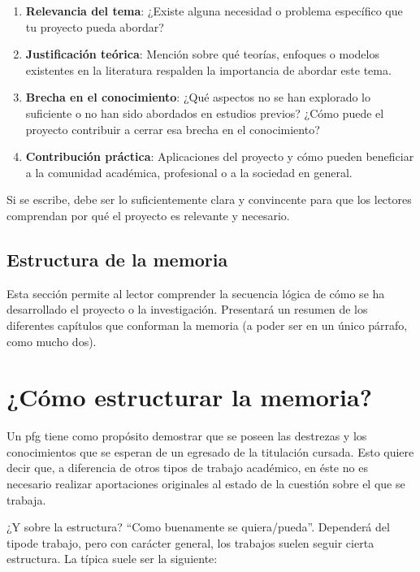\documentclass[%
    school=etsisi,%
    degree=61TI,%
]{upm-report}
\begin{document}
\begin{enumerate}
    \item \textbf{Relevancia del tema}: ¿Existe alguna necesidad o
        problema específico que tu proyecto pueda abordar?
    \item \textbf{Justificación teórica}: Mención sobre qué teorías,
        enfoques o modelos existentes en la literatura respalden la
        importancia de abordar este tema.
    \item \textbf{Brecha en el conocimiento}: ¿Qué aspectos no se han
        explorado lo suficiente o no han sido abordados en estudios
        previos? ¿Cómo puede el proyecto contribuir a cerrar esa brecha
        en el conocimiento?
    \item \textbf{Contribución práctica}: Aplicaciones del proyecto y
        cómo pueden beneficiar a la comunidad académica, profesional o
        a la sociedad en general.
\end{enumerate}

Si se escribe, debe ser lo suficientemente clara y convincente para que
los lectores comprendan por qué el proyecto es relevante y necesario.

\section{Estructura de la memoria}

Esta sección permite al lector comprender la secuencia lógica de cómo se
ha desarrollado el proyecto o la investigación. Presentará un resumen de
los diferentes capítulos que conforman la memoria (a poder ser en un
único párrafo, como mucho dos).

\chapter{¿Cómo estructurar la memoria?}
\label{s:como-estructurar}

Un \gls{pfg} tiene como propósito demostrar que se poseen las destrezas
y los conocimientos que se esperan de un egresado de la titulación
cursada. Esto quiere decir que, a diferencia de otros tipos de trabajo
académico, en éste no es necesario realizar aportaciones originales al
estado de la cuestión sobre el que se trabaja.

¿Y sobre la estructura? \enquote{Como buenamente se quiera/pueda}.
Dependerá del tipode trabajo, pero con carácter general, los trabajos
suelen seguir cierta estructura. La típica suele ser la siguiente:
\end{document}
